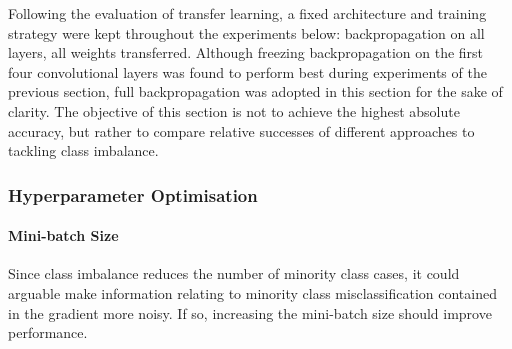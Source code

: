 \documentclass[a4paper,11pt]{article}
\begin{document}
Following the evaluation of transfer learning, a fixed architecture and training strategy were kept throughout the experiments below: backpropagation on all layers, all weights transferred. Although freezing backpropagation on the first four convolutional layers was found to perform best during experiments of the previous section, full backpropagation was adopted in this section for the sake of clarity. The objective of this section is not to achieve the highest absolute accuracy, but rather to compare relative successes of different approaches to tackling class imbalance.


\subsubsection{Hyperparameter Optimisation}

%
%
%



\paragraph{Mini-batch Size}

Since class imbalance reduces the number of minority class cases, it could arguable make information relating to minority class misclassification contained in the gradient more noisy. If so, increasing the mini-batch size should improve performance.
\end{document}
